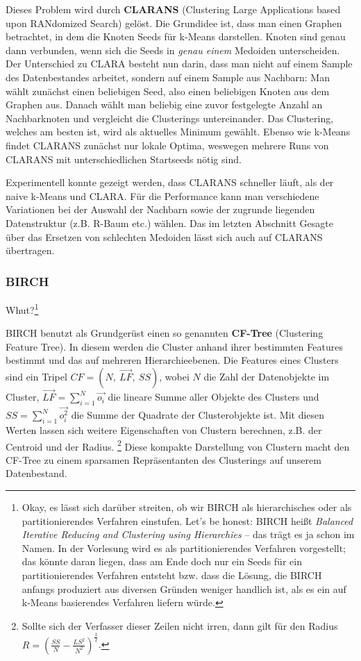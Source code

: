 Dieses Problem wird durch \textbf{CLARANS} (Clustering Large
Applications based upon RANdomized Search) gelöst. Die Grundidee
ist, dass man einen Graphen betrachtet, in dem die Knoten Seeds
für k-Means darstellen. Knoten sind genau dann verbunden, wenn
sich die Seeds in \textit{genau einem} Medoiden unterscheiden.
Der Unterschied zu CLARA besteht nun darin, dass man nicht auf einem
Sample des Datenbestandes arbeitet, sondern auf einem Sample aus
Nachbarn: Man wählt zunächst einen beliebigen Seed, also einen 
beliebigen Knoten aus dem Graphen aus. Danach wählt man beliebig eine
zuvor festgelegte Anzahl an Nachbarknoten und vergleicht die Clusterings
untereinander. Das Clustering, welches am besten ist, wird als aktuelles
Minimum gewählt. Ebenso wie k-Means findet CLARANS zunächst nur 
lokale Optima, weswegen mehrere Runs von CLARANS mit unterschiedlichen
Startseeds nötig sind. 

Experimentell konnte gezeigt werden, dass CLARANS schneller läuft,
als der naive k-Means und CLARA. Für die Performance kann man
verschiedene Variationen bei der Auswahl der Nachbarn sowie der
zugrunde liegenden Datenstruktur (z.B. R-Baum etc.) wählen. Das im
letzten Abschnitt Gesagte über das Ersetzen von schlechten Medoiden
lässt sich auch auf CLARANS übertragen.

\subsubsection{BIRCH}
Whut?\footnote{Okay, es lässt sich darüber streiten, ob wir BIRCH als
hierarchisches
oder als partitionierendes Verfahren einstufen. Let's be honest: BIRCH
heißt \textit{Balanced Iterative Reducing and Clustering using Hierarchies}
-- das trägt es ja schon im Namen. In der Vorlesung wird es als
partitionierendes Verfahren vorgestellt; das könnte daran liegen, dass
am Ende doch nur ein Seeds für ein partitionierendes Verfahren entsteht 
bzw. dass die Lösung, die BIRCH anfangs produziert aus diversen
Gründen weniger handlich ist, als es ein auf k-Means basierendes Verfahren
liefern würde.}

\noindent BIRCH benutzt als Grundgerüst einen so genannten
\textbf{CF-Tree} (Clustering Feature Tree). In diesem werden die
Cluster anhand ihrer bestimmten Features bestimmt und das auf
mehreren Hierarchieebenen. Die Features eines Clusters sind ein
Tripel \(CF=(N,\ \vec{LF},\ SS)\), wobei \(N\) die Zahl der 
Datenobjekte im Cluster, \(\vec{LF} = \sum\nolimits_{i=1}^N
\vec{o_i}\) die lineare Summe aller Objekte des Clusters und 
\(SS=\sum\nolimits_{i=1}^N
\vec{o_{i}^2}\) die Summe der Quadrate der Clusterobjekte ist.
Mit diesen Werten lassen sich weitere Eigenschaften von Clustern
berechnen, z.B. der Centroid und der Radius.
\footnote{Sollte sich der Verfasser dieser Zeilen nicht irren, dann gilt
für den Radius \(R = \left(\frac{SS}{N}-\frac{LS^2}{N^2}\right)^{\frac{1}{2}}\).}
Diese kompakte 
Darstellung von Clustern macht den CF-Tree zu einem sparsamen
Repräsentanten des Clusterings auf unserem Datenbestand. 

